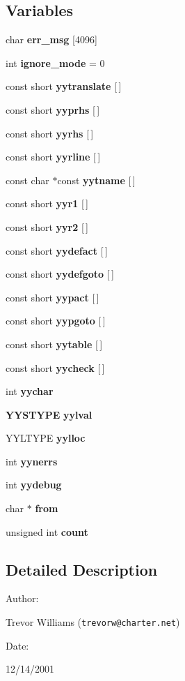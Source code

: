 \subsection*{Variables}
\begin{CompactItemize}
\item 
char {\bf err\_\-msg} [4096]
\item 
int {\bf ignore\_\-mode} = 0
\item 
const short {\bf yytranslate} [$\,$]
\item 
const short {\bf yyprhs} [$\,$]
\item 
const short {\bf yyrhs} [$\,$]
\item 
const short {\bf yyrline} [$\,$]
\item 
const char $\ast$const {\bf yytname} [$\,$]
\item 
const short {\bf yyr1} [$\,$]
\item 
const short {\bf yyr2} [$\,$]
\item 
const short {\bf yydefact} [$\,$]
\item 
const short {\bf yydefgoto} [$\,$]
\item 
const short {\bf yypact} [$\,$]
\item 
const short {\bf yypgoto} [$\,$]
\item 
const short {\bf yytable} [$\,$]
\item 
const short {\bf yycheck} [$\,$]
\item 
int {\bf yychar}
\item 
{\bf YYSTYPE} {\bf yylval}
\item 
YYLTYPE {\bf yylloc}
\item 
int {\bf yynerrs}
\item 
int {\bf yydebug}
\item 
char $\ast$ {\bf from}
\item 
unsigned int {\bf count}
\end{CompactItemize}


\subsection{Detailed Description}


\begin{Desc}
\item[Author: ]\par
Trevor Williams ({\tt trevorw@charter.net}) \end{Desc}
\begin{Desc}
\item[Date: ]\par
12/14/2001\end{Desc}


